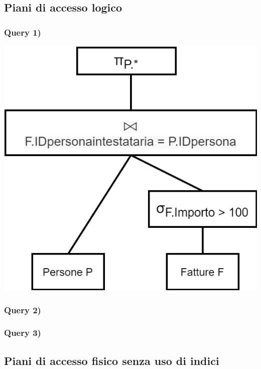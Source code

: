\documentclass[a4paper,12pt]{article}
\begin{document}
 \subsection{ Piani di accesso logico }

 \subsubsection{ Query 1) }

\begin{minipage}{\textwidth}
\begin{center}
\centering 
\centerline{
\includegraphics[width=\textwidth -8cm]{ Albero logico 1.png }
}
\end{center}
\end{minipage}

 \subsubsection{ Query 2) }

 \subsubsection{ Query 3) }

 \subsection{ Piani di accesso fisico senza uso di indici }
\end{document}
